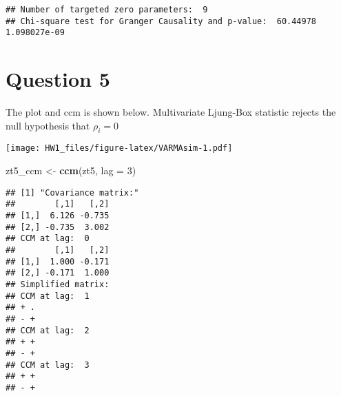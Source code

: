 \documentclass[]{article}
\newenvironment{Shaded}{\begin{snugshade}}{\end{snugshade}}
\newcommand{\KeywordTok}[1]{\textcolor[rgb]{0.13,0.29,0.53}{\textbf{#1}}}
\newcommand{\DataTypeTok}[1]{\textcolor[rgb]{0.13,0.29,0.53}{#1}}
\newcommand{\DecValTok}[1]{\textcolor[rgb]{0.00,0.00,0.81}{#1}}
\newcommand{\FloatTok}[1]{\textcolor[rgb]{0.00,0.00,0.81}{#1}}
\newcommand{\StringTok}[1]{\textcolor[rgb]{0.31,0.60,0.02}{#1}}
\newcommand{\OperatorTok}[1]{\textcolor[rgb]{0.81,0.36,0.00}{\textbf{#1}}}
\newcommand{\NormalTok}[1]{#1}
\begin{document}
\begin{verbatim}
## Number of targeted zero parameters:  9 
## Chi-square test for Granger Causality and p-value:  60.44978 1.098027e-09
\end{verbatim}

\section{Question 5}\label{question-5}

The plot and ccm is shown below. Multivariate Ljung-Box statistic
rejects the null hypothesis that \(\rho_{i}=0\)

\begin{Shaded}
\end{Shaded}

\texttt{[image: HW1\_files/figure-latex/VARMAsim-1.pdf]}

\begin{Shaded}
\begin{Highlighting}[]
\NormalTok{zt5_ccm <-}\StringTok{ }\KeywordTok{ccm}\NormalTok{(zt5, }\DataTypeTok{lag =} \DecValTok{3}\NormalTok{)}
\end{Highlighting}
\end{Shaded}

\begin{verbatim}
## [1] "Covariance matrix:"
##        [,1]   [,2]
## [1,]  6.126 -0.735
## [2,] -0.735  3.002
## CCM at lag:  0 
##        [,1]   [,2]
## [1,]  1.000 -0.171
## [2,] -0.171  1.000
## Simplified matrix: 
## CCM at lag:  1 
## + . 
## - + 
## CCM at lag:  2 
## + + 
## - + 
## CCM at lag:  3 
## + + 
## - +
\end{verbatim}
\end{document}
